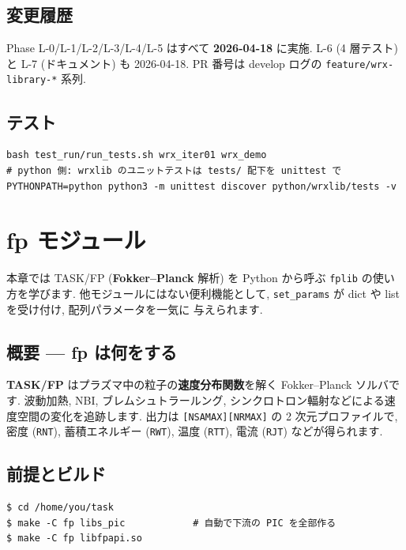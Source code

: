 \documentclass[11pt,a4paper]{report}
\begin{document}
\section{変更履歴}

Phase L-0/L-1/L-2/L-3/L-4/L-5 はすべて \textbf{2026-04-18} に実施.
L-6 (4 層テスト) と L-7 (ドキュメント) も 2026-04-18. PR 番号は
develop ログの \texttt{feature/wrx-library-*} 系列.

\section{テスト}

\begin{lstlisting}[style=bash]
bash test_run/run_tests.sh wrx_iter01 wrx_demo
# python 側: wrxlib のユニットテストは tests/ 配下を unittest で
PYTHONPATH=python python3 -m unittest discover python/wrxlib/tests -v
\end{lstlisting}

\clearpage
\chapter{fp モジュール}
\label{ch:fp}

\begin{learn}
本章では TASK/FP (\textbf{Fokker--Planck} 解析) を Python から呼ぶ
\texttt{fplib} の使い方を学びます. 他モジュールにはない便利機能として,
\texttt{set\_params} が dict や list を受け付け, 配列パラメータを一気に
与えられます.
\end{learn}

\section{概要 — fp は何をする}

\textbf{TASK/FP} はプラズマ中の粒子の\textbf{速度分布関数}を解く
Fokker--Planck ソルバです. 波動加熱, NBI, ブレムシュトラールング,
シンクロトロン輻射などによる速度空間の変化を追跡します.
出力は \texttt{[NSAMAX][NRMAX]} の 2 次元プロファイルで,
密度 (\texttt{RNT}), 蓄積エネルギー (\texttt{RWT}), 温度
(\texttt{RTT}), 電流 (\texttt{RJT}) などが得られます.

\section{前提とビルド}

\begin{lstlisting}[style=bash]
$ cd /home/you/task
$ make -C fp libs_pic            # 自動で下流の PIC を全部作る
$ make -C fp libfpapi.so
\end{lstlisting}
\end{document}
